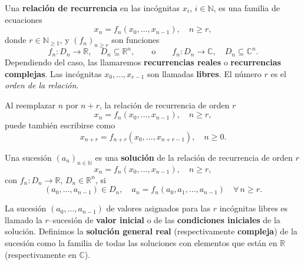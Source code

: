 \begin{definition}
	Una \textbf{relación de recurrencia} en las incógnitas $x_{i}$, $i\in\mathds{N}$, es una familia de ecuaciones
	\begin{equation*}
	x_{n}=f_{n}\left(x_{0},\ldots,x_{n-1}\right),\quad n\geq r,
	\end{equation*}
	donde $r\in\mathds{N}_{\geq1}$, y ${\left(f_{n}\right)}_{n\geq r}$ son funciones
	\begin{equation*}
	f_{n}\colon D_{n}\rightarrow\mathds{R},\quad D_{n}\subseteq\mathds{R}^{n},\qquad\text{o}\qquad f_{n}\colon D_{n}\rightarrow\mathds{C},\quad D_{n}\subseteq\mathds{C}^{n}.
	\end{equation*}
	Dependiendo del caso, las llamaremos \textbf{recurrencias reales} o \textbf{recurrencias complejas}. Las incógnitas $x_{0},\ldots,x_{r-1}$ son llamadas \textbf{libres}. El número $r$ es el \emph{orden de la relación}.
	
	Al reemplazar $n$ por $n+r$, la relación de recurrencia de orden $r$
	\begin{equation*}
	x_{n}=f_{n}\left(x_{0},\ldots,x_{n-1}\right),\quad n\geq r,
	\end{equation*}
	puede también escribirse como
	\begin{equation*}
	x_{n+r}=f_{n+r}\left(x_{0},\ldots,x_{n+r-1}\right),\quad n\geq0.
	\end{equation*}
\end{definition}

\begin{definition}
	Una sucesión ${\left(a_{n}\right)}_{n\in\mathds{N}}$ es una \textbf{solución} de la relación de recurrencia de orden $r$
	\begin{equation}
	x_{n}=f_{n}\left(x_{0},\ldots,x_{n-1}\right),\quad n\geq r,
	\end{equation}
	con $f_{n}\colon D_{n}\rightarrow\mathds{R}$, $D_{n}\in\mathds{R}^{n}$, si
	\begin{equation*}
	\left(a_{0},\ldots,a_{n-1}\right)\in D_{n},\quad a_{n}=f_{n}\left(a_{0},a_{1},\ldots,a_{n-1}\right)\quad\forall\,n\geq r.
	\end{equation*}
\end{definition}

La sucesión $\left(a_{0},\ldots,a_{n-1}\right)$ de valores asignados para las $r$ incógnitas libres es llamado la $r$--sucesión de \textbf{valor inicial} o de las \textbf{condiciones iniciales} de la solución. Definimos la \textbf{solución general real} (respectivamente \textbf{compleja}) de la sucesión como la familia de todas las soluciones con elementos que están en $\mathds{R}$ (respectivamente en $\mathds{C}$).

